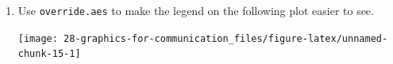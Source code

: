 \documentclass[]{book}
\newenvironment{Shaded}{\begin{snugshade}}{\end{snugshade}}
\newcommand{\DataTypeTok}[1]{\textcolor[rgb]{0.13,0.29,0.53}{#1}}
\newcommand{\DecValTok}[1]{\textcolor[rgb]{0.00,0.00,0.81}{#1}}
\newcommand{\KeywordTok}[1]{\textcolor[rgb]{0.13,0.29,0.53}{\textbf{#1}}}
\newcommand{\NormalTok}[1]{#1}
\newcommand{\OperatorTok}[1]{\textcolor[rgb]{0.81,0.36,0.00}{\textbf{#1}}}
\newcommand{\StringTok}[1]{\textcolor[rgb]{0.31,0.60,0.02}{#1}}
\theoremstyle{definition}
\theoremstyle{definition}
\theoremstyle{definition}
\theoremstyle{remark}
\begin{document}
\begin{enumerate}
\def\labelenumi{\arabic{enumi}.}
\item
  Use \texttt{override.aes} to make the legend on the following plot
  easier to see.

\begin{Shaded}
\end{Shaded}

  \texttt{[image: 28-graphics-for-communication\_files/figure-latex/unnamed-chunk-15-1]}
\end{enumerate}


\end{document}
